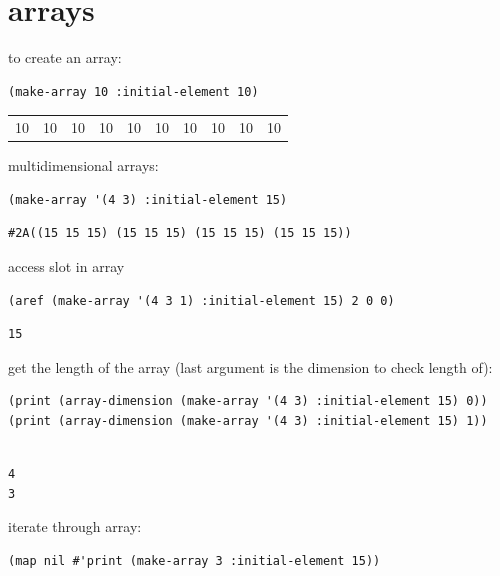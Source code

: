 \documentclass[a4paper,12pt]{article}
\begin{document}
\section{arrays}
\label{sec:org5f6c6ac}
to create an array:\\
\lstset{language=Lisp,label= ,caption= ,captionpos=b,numbers=none}
\begin{lstlisting}
(make-array 10 :initial-element 10)
\end{lstlisting}

\begin{tabular}{rrrrrrrrrr}
10 & 10 & 10 & 10 & 10 & 10 & 10 & 10 & 10 & 10\\
\end{tabular}

multidimensional arrays:\\
\lstset{language=Lisp,label= ,caption= ,captionpos=b,numbers=none}
\begin{lstlisting}
(make-array '(4 3) :initial-element 15)
\end{lstlisting}

\begin{verbatim}
#2A((15 15 15) (15 15 15) (15 15 15) (15 15 15))
\end{verbatim}


access slot in array\\
\lstset{language=Lisp,label= ,caption= ,captionpos=b,numbers=none}
\begin{lstlisting}
(aref (make-array '(4 3 1) :initial-element 15) 2 0 0)
\end{lstlisting}

\begin{verbatim}
15
\end{verbatim}


get the length of the array (last argument is the dimension to check length of):\\
\lstset{language=Lisp,label= ,caption= ,captionpos=b,numbers=none}
\begin{lstlisting}
(print (array-dimension (make-array '(4 3) :initial-element 15) 0))
(print (array-dimension (make-array '(4 3) :initial-element 15) 1))
\end{lstlisting}

\begin{verbatim}

4 
3 
\end{verbatim}


iterate through array:\\
\lstset{language=Lisp,label= ,caption= ,captionpos=b,numbers=none}
\begin{lstlisting}
(map nil #'print (make-array 3 :initial-element 15))
\end{lstlisting}
\end{document}
